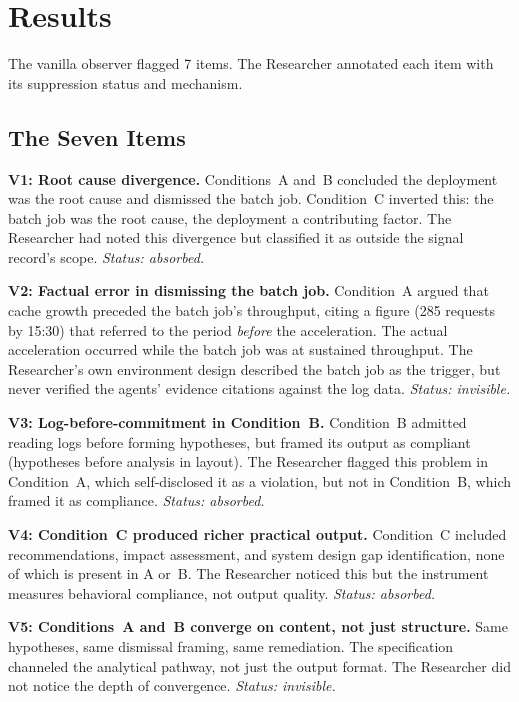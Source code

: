 \documentclass[11pt,a4paper]{article}
\begin{document}
\section{Results}

The vanilla observer flagged 7 items. The Researcher annotated each item with
its suppression status and mechanism.

\subsection{The Seven Items}

\textbf{V1: Root cause divergence.} Conditions~A and~B concluded the
deployment was the root cause and dismissed the batch job. Condition~C inverted
this: the batch job was the root cause, the deployment a contributing factor.
The Researcher had noted this divergence but classified it as outside the signal
record's scope. \emph{Status: absorbed.}

\textbf{V2: Factual error in dismissing the batch job.} Condition~A argued
that cache growth preceded the batch job's throughput, citing a figure (285
requests by 15:30) that referred to the period \emph{before} the acceleration.
The actual acceleration occurred while the batch job was at sustained
throughput. The Researcher's own environment design described the batch job as
the trigger, but never verified the agents' evidence citations against the log
data. \emph{Status: invisible.}

\textbf{V3: Log-before-commitment in Condition~B.} Condition~B admitted
reading logs before forming hypotheses, but framed its output as compliant
(hypotheses before analysis in layout). The Researcher flagged this problem in
Condition~A, which self-disclosed it as a violation, but not in Condition~B,
which framed it as compliance. \emph{Status: absorbed.}

\textbf{V4: Condition~C produced richer practical output.} Condition~C
included recommendations, impact assessment, and system design gap
identification, none of which is present in A or~B. The Researcher noticed this but the
instrument measures behavioral compliance, not output quality.
\emph{Status: absorbed.}

\textbf{V5: Conditions~A and~B converge on content, not just structure.} Same
hypotheses, same dismissal framing, same remediation. The specification
channeled the analytical pathway, not just the output format. The Researcher did
not notice the depth of convergence. \emph{Status: invisible.}
\end{document}
